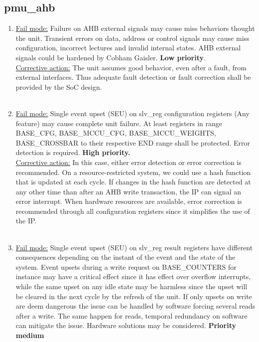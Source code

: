 \subsection{pmu\_ahb}
\begin{enumerate}
\item \underline{Fail mode:} Failure on AHB external signals may cause miss behaviors thought the unit. Transient errors on data, address or control signals may cause miss configuration, incorrect lectures and invalid internal states. AHB external signals could be hardened by Cobham Gaisler. \textbf{Low priority}.\\
\underline{Corrective action:} The unit assumes good behavior, even after a fault, from external interfaces. Thus adequate fault detection or fault correction shall be provided by the SoC design.\\
\\
\item \underline{Fail mode:} Single event upset (SEU) on slv\_reg configuration registers (Any feature) may cause complete unit failure. At least registers in range BASE\_CFG, BASE\_MCCU\_CFG, BASE\_MCCU\_WEIGHTS, BASE\_CROSSBAR to their respective END range shall be protected. Error detection is required. \textbf{High priority.}\\
\underline{Corrective action:} In this case, either error detection or error correction is recommended. On a resource-restricted system, we could use a hash function that is updated at each cycle. If changes in the hash function are detected at any other time than after an AHB write transaction, the IP can signal an error interrupt.  When hardware resources are available, error correction is recommended through all configuration registers since it simplifies the use of the IP.\\
\\
\item \underline{Fail mode:} Single event upset (SEU) on slv\_reg result registers have different consequences depending on the instant of the event and the state of the system. Event upsets during a write request on BASE\_COUNTERS for instance may have a critical effect since it has effect over overflow interrupts, while the same upset on any idle state may be harmless since the upset will be cleared in the next cycle by the refresh of the unit. If only upsets on write are deem dangerous the issue can be handled by software forcing several reads after a write. The same happen for reads, temporal redundancy on software can mitigate the issue. Hardware solutions may be considered. \textbf{Priority medium}\\

\end{enumerate}
